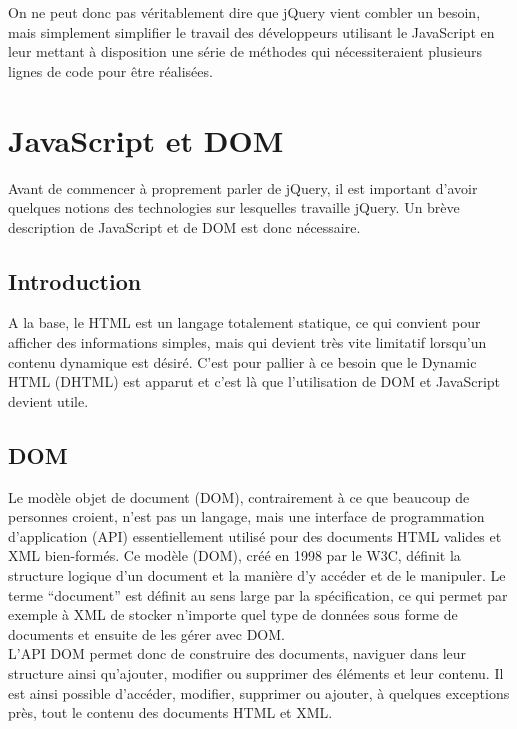 \documentclass[10pt,a4paper,titlepage]{article}
\begin{document}
On ne peut donc pas véritablement dire que jQuery vient combler un besoin, mais simplement simplifier le travail des développeurs utilisant le JavaScript en leur mettant à disposition une série de méthodes qui nécessiteraient plusieurs lignes de code pour être réalisées.

\newpage
\section{JavaScript et DOM}
Avant de commencer à proprement parler de jQuery, il est important d'avoir quelques notions des technologies sur lesquelles travaille jQuery. Un brève description de JavaScript et de DOM est donc nécessaire.

\subsection{Introduction}
A la base, le HTML est un langage totalement statique, ce qui convient pour afficher des informations simples, mais qui devient très vite limitatif lorsqu'un contenu dynamique est désiré. C'est pour pallier à ce besoin que le Dynamic HTML (DHTML) est apparut et c'est là que l'utilisation de DOM et JavaScript devient utile.

\subsection{DOM}
Le modèle objet de document (DOM), contrairement à ce que beaucoup de personnes croient, n'est pas un langage, mais une interface de programmation d'application (API) essentiellement utilisé pour des documents HTML valides et XML bien-formés. Ce modèle (DOM), créé en 1998 par le W3C, définit la structure logique d'un document et la manière d'y accéder et de le manipuler. Le terme “document” est définit au sens large par la spécification, ce qui permet par exemple à XML de stocker n'importe quel type de données sous forme de documents et ensuite de les gérer avec DOM.\\

L'API DOM permet donc de construire des documents, naviguer dans leur structure ainsi qu'ajouter, modifier ou supprimer des éléments et leur contenu. Il est ainsi possible d'accéder, modifier, supprimer ou ajouter, à quelques exceptions près, tout le contenu des documents HTML et XML.\\
\end{document}
